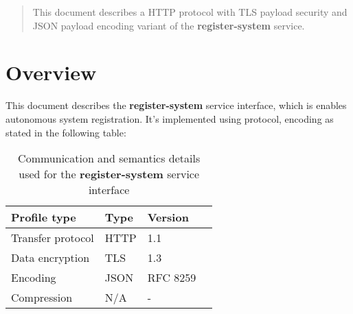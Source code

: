 \documentclass[a4paper]{arrowhead}
\begin{document}
\ArrowheadDate{\today}
\ArrowheadSetup

\begin{center}
  \vspace*{1cm}
  \huge{\arrowtitle}

  \vspace*{0.2cm}
  \LARGE{\arrowtype}
  \vspace*{1cm}
\end{center}

  \vspace*{\fill}


  \vspace*{1cm}
  \vspace*{\fill}

  \begin{abstract}
    This document describes a HTTP protocol with TLS payload
    security and JSON payload encoding variant of the \textbf{register-system} service.
  \end{abstract}
  \vspace*{1cm}

\newpage

\tableofcontents
\newpage

\section{Overview}
\label{sec:overview}

This document describes the \textbf{register-system} service interface,
which is enables autonomous system registration. It's implemented using protocol, encoding as stated in the following table:

\begin{table}[ht!]
  \centering
  \begin{tabular}{|l|l|l|l|}
    \rowcolor{gray!33} Profile type & Type & Version \\ \hline
    Transfer protocol & HTTP & 1.1 \\ \hline
    Data encryption & TLS & 1.3 \\ \hline
    Encoding & JSON & RFC 8259 \cite{rfc8259} \\ \hline
    Compression & N/A & - \\ \hline
  \end{tabular}
  \caption{Communication and semantics details used for the \textbf{register-system}
    service interface}
  \label{tab:comunication_semantics_profile}
\end{table}
\end{document}
